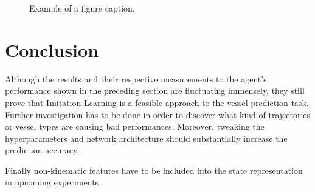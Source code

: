 \documentclass[conference]{IEEEtran}
\begin{document}
\begin{figure}[t]
\centering

\caption{Example of a figure caption.}
\label{fig:result}
\end{figure}
\section{Conclusion}
Although the results and their respective measurements to the agent's performance shown in the preceding section are fluctuating immensely, they still prove that Imitation Learning is a feasible approach to the vessel prediction task. Further investigation has to be done in order to discover what kind of trajectories or vessel types are causing bad performances. Moreover, tweaking the hyperparameters and network architecture should substantially increase the prediction accuracy.
\par
Finally non-kinematic features have to be included into the state representation in upcoming experiments.



\end{document}
